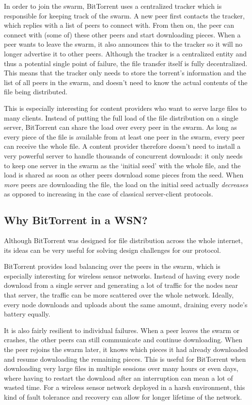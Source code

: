 \documentclass[ DIV=calc,%
                paper=a4,%
                fontsize=12pt,%
                twocolumn%
              ]{scrartcl}	 			%
\begin{document}
In order to join the swarm, BitTorrent uses a centralized tracker which is responsible for keeping track of the swarm. A new peer first contacts the tracker, which replies with a list of peers to connect with. From then on, the peer can connect with (some of) these other peers and start downloading pieces. When a peer wants to leave the swarm, it also announces this to the tracker so it will no longer advertise it to other peers. Although the tracker is a centralized entity and thus a potential single point of failure, the file transfer itself is fully decentralized. This means that the tracker only needs to store the torrent's information and the list of all peers in the swarm, and doesn't need to know the actual contents of the file being distributed.

This is especially interesting for content providers who want to serve large files to many clients. Instead of putting the full load of the file distribution on a single server, BitTorrent can share the load over every peer in the swarm. As long as every piece of the file is available from at least one peer in the swarm, every peer can receive the whole file. A content provider therefore doesn't need to install a very powerful server to handle thousands of concurrent downloads: it only needs to keep one server in the swarm as the `initial seed' with the whole file, and the load is shared as soon as other peers download some pieces from the seed. When \emph{more} peers are downloading the file, the load on the initial seed actually \emph{decreases} as opposed to increasing in the case of classical server-client protocols.

\subsection*{Why BitTorrent in a WSN?}
Although BitTorrent was designed for file distribution across the whole internet, its ideas can be very useful for solving design challenges for our protocol.

BitTorrent provides load balancing over the peers in the swarm, which is especially interesting for wireless sensor networks. Instead of having every node download from a single server and generating a lot of traffic for the nodes near that server, the traffic can be more scattered over the whole network. Ideally, every node downloads and uploads about the same amount, draining every node's battery equally.

It is also fairly resilient to individual failures. When a peer leaves the swarm or crashes, the other peers can still communicate and continue downloading. When the peer rejoins the swarm later, it knows which pieces it had already downloaded and resume downloading the remaining pieces. This is useful for BitTorrent when downloading very large files in multiple sessions over many hours or even days, where having to restart the download after an interruption can mean a lot of wasted time. For a wireless sensor network deployed in a harsh environment, this kind of fault tolerance and recovery can allow for longer lifetime of the network.
\end{document}
